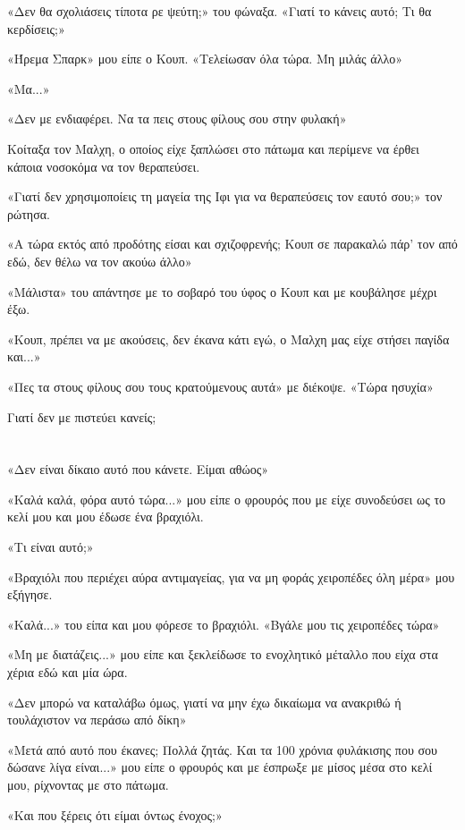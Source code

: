 \documentclass[12pt,twoside, openany]{book}
\begin{document}
«Δεν θα σχολιάσεις τίποτα ρε ψεύτη;» του φώναξα. «Γιατί το κάνεις αυτό; Τι θα κερδίσεις;»

«Ήρεμα Σπαρκ» μου είπε ο Κουπ. «Τελείωσαν όλα τώρα. Μη μιλάς άλλο»

«Μα...»

«Δεν με ενδιαφέρει. Να τα πεις στους φίλους σου στην φυλακή»

Κοίταξα τον Μαλχη, ο οποίος είχε ξαπλώσει στο πάτωμα και περίμενε να έρθει κάποια νοσοκόμα να τον θεραπεύσει.

«Γιατί δεν χρησιμοποίεις τη μαγεία της Ιφι για να θεραπεύσεις τον εαυτό σου;» τον ρώτησα.

«Α τώρα εκτός από προδότης είσαι και σχιζοφρενής; Κουπ σε παρακαλώ πάρ’ τον από εδώ, δεν θέλω να τον ακούω άλλο»

«Μάλιστα» του απάντησε με το σοβαρό του ύφος ο Κουπ και με κουβάλησε μέχρι έξω.

«Κουπ, πρέπει να με ακούσεις, δεν έκανα κάτι εγώ, ο Μαλχη μας είχε στήσει παγίδα και...»

«Πες τα στους φίλους σου τους κρατούμενους αυτά» με διέκοψε. «Τώρα ησυχία»

Γιατί δεν με πιστεύει κανείς;

\chapter{}

«Δεν είναι δίκαιο αυτό που κάνετε. Είμαι αθώος»

«Καλά καλά, φόρα αυτό τώρα...» μου είπε ο φρουρός που με είχε συνοδεύσει ως το κελί μου και μου έδωσε ένα βραχιόλι.

«Τι είναι αυτό;»

«Βραχιόλι που περιέχει αύρα αντιμαγείας, για να μη φοράς χειροπέδες όλη μέρα» μου εξήγησε.

«Καλά...» του είπα και μου φόρεσε το βραχιόλι. «Βγάλε μου τις χειροπέδες τώρα»

«Μη με διατάζεις...» μου είπε και ξεκλείδωσε το ενοχλητικό μέταλλο που είχα στα χέρια εδώ και μία ώρα.

«Δεν μπορώ να καταλάβω όμως, γιατί να μην έχω δικαίωμα να ανακριθώ ή τουλάχιστον να περάσω από δίκη»

«Μετά από αυτό που έκανες; Πολλά ζητάς. Και τα 100 χρόνια φυλάκισης που σου δώσανε λίγα είναι...» μου είπε ο φρουρός και με έσπρωξε με μίσος μέσα στο κελί μου, ρίχνοντας με στο πάτωμα.

«Και που ξέρεις ότι είμαι όντως ένοχος;»
\end{document}

